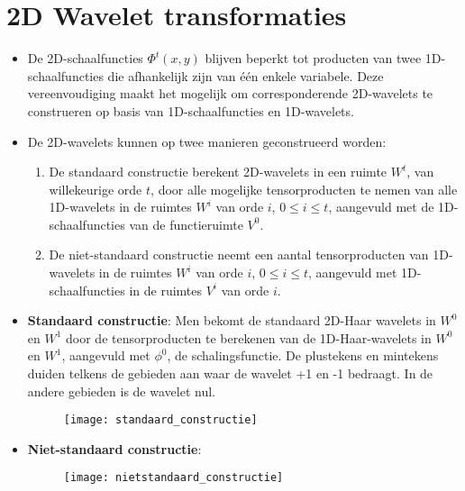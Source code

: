 \section{2D Wavelet transformaties }
\begin{enumerate}
	{
		\begin{itemize} 
			\item De 2D-schaalfuncties $\Phi^t(x, y)$ blijven beperkt tot producten van twee 1D-schaalfuncties die afhankelijk zijn van één enkele variabele. Deze vereenvoudiging maakt het mogelijk om corresponderende 2D-wavelets te construeren op basis van 1D-schaalfuncties en 1D-wavelets.
			\item De 2D-wavelets kunnen op twee manieren geconstrueerd worden:
			\begin{enumerate}
				\item De standaard constructie berekent 2D-wavelets in een ruimte $W^t$, van willekeurige orde $t$, door alle mogelijke tensorproducten te nemen van alle 1D-wavelets in de ruimtes $W^i$ van orde $i$, $0 \leq i \leq t$, aangevuld met de 1D-schaalfuncties van de functieruimte $V^0$.
		
				\item De niet-standaard constructie neemt een aantal tensorproducten van 1D-wavelets in de ruimtes $W^i$ van orde $i$, $0\leq i\leq t$, aangevuld met 1D-schaalfuncties in de ruimtes $V^i$ van orde $i$.
			\end{enumerate}
		\end{itemize}
	}
			
	{\begin{itemize} 
		\item \textbf{Standaard constructie}:
		Men bekomt de standaard 2D-Haar wavelets in $W^0$ en $W^1$ door de tensorproducten te berekenen van de 1D-Haar-wavelets in $W^0$ en $W^1$, aangevuld met $\phi^0$, de schalingsfunctie. De plustekens en mintekens duiden telkens de gebieden aan waar de wavelet +1 en -1 bedraagt. In de andere gebieden is de wavelet nul.
		\begin{figure}[ht]
			\centering
			\texttt{[image: standaard\_constructie]}
		\end{figure}
		\item \textbf{Niet-standaard constructie}:
		\begin{figure}[ht]
			\centering
			\texttt{[image: nietstandaard\_constructie]}
		\end{figure}
	 \end{itemize}}
\end{enumerate}

